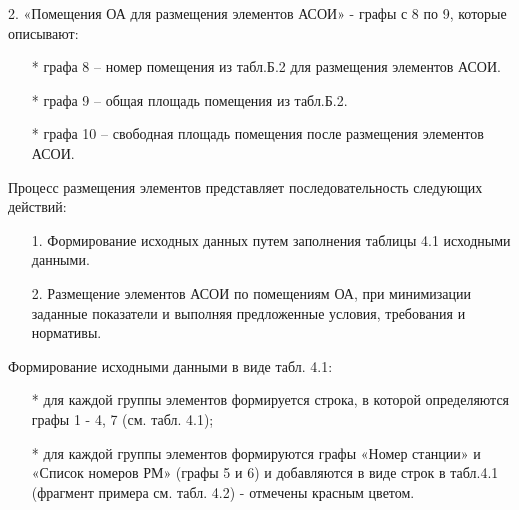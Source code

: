 \documentclass[12pt, a4paper, simple]{eskdtext}
\begin{document}
    2. «Помещения ОА для размещения элементов  АСОИ» - графы с 8 по 9, которые описывают:
        
    \begin{itemize}
        \item[*] графа 8 – номер помещения из табл.Б.2  для размещения элементов АСОИ. 
        \item[*] графа 9 – общая площадь помещения из табл.Б.2. 
        \item[*] графа 10 – свободная площадь помещения после размещения элементов АСОИ. 
    \end{itemize}

    Процесс размещения элементов представляет последовательность следующих действий:
    \begin{enumerate}
        \item[1.] Формирование исходных данных путем заполнения таблицы 4.1 исходными данными.
        \item[2.] Размещение элементов АСОИ по помещениям ОА, при минимизации заданные показатели
        и вы­полняя предложенные условия, требования и нормативы. 
    \end{enumerate}

    Формирование исходными данными в виде табл. 4.1:
    \begin{itemize}
        \item[*] для каждой группы элементов формируется строка, в которой определяются графы 1 - 4, 7 (см. табл. 4.1);
        \item[*] для каждой группы элементов формируются графы «Номер станции»
        и «Список номеров РМ» (графы 5 и 6) и добавляются в виде строк в табл.4.1
        (фрагмент примера см. табл. 4.2) - отме­чены красным цветом.
    \end{itemize}

\end{document}
